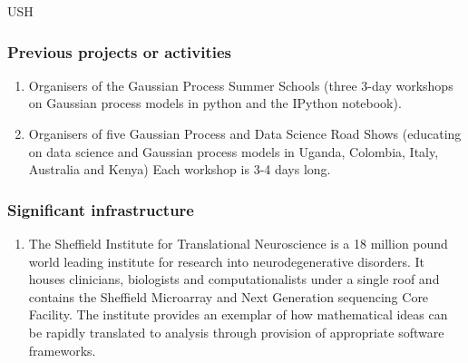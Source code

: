 \begin{sitedescription}{USH}
\subsubsection*{Previous projects or activities}

\begin{enumerate}
\item Organisers of the Gaussian Process Summer Schools (three 3-day workshops on Gaussian process models in python and the IPython notebook).
\item Organisers of five Gaussian Process and Data Science Road Shows (educating on data science and Gaussian process models in Uganda, Colombia, Italy, Australia and Kenya) Each workshop is 3-4 days long. 
\end{enumerate}

\subsubsection*{Significant infrastructure}
\begin{enumerate}
\item The Sheffield Institute for Translational Neuroscience is a 18 million pound world leading institute for research into neurodegenerative disorders. It houses clinicians, biologists and computationalists under a single roof and contains the Sheffield Microarray and Next Generation sequencing Core Facility. The institute provides an exemplar of how mathematical ideas can be rapidly translated to analysis through provision of appropriate software frameworks.
\end{enumerate}
\end{sitedescription}


